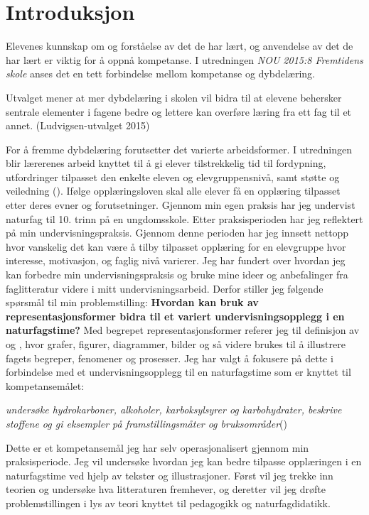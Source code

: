 \documentclass[main.tex]{subfiles}
\begin{document}
\section*{Introduksjon}

Elevenes kunnskap om og forståelse av det de har lært, og anvendelse av det de har lært er viktig for å oppnå kompetanse. I utredningen \emph{NOU 2015:8 Fremtidens skole} anses det en tett forbindelse mellom kompetanse og dybdelæring.
\begin{displayquote}
Utvalget mener at mer dybdelæring i skolen vil bidra til at elevene behersker sentrale elementer i fagene bedre og lettere kan overføre læring fra ett fag til et annet. (Ludvigsen-utvalget 2015)
\end{displayquote}
For å fremme dybdelæring forutsetter det varierte arbeidsformer. I utredningen blir lærerenes arbeid knyttet til å gi elever tilstrekkelig tid til fordypning, utfordringer tilpasset den enkelte eleven og elevgruppensnivå, samt støtte og veiledning ().
\newline\newline
Ifølge opplæringsloven skal alle elever få en opplæring tilpasset etter deres evner og forutsetninger. Gjennom min egen praksis har jeg undervist naturfag til 10. trinn på en ungdomsskole. Etter praksisperioden har jeg reflektert på min undervisningspraksis. Gjennom denne perioden har jeg innsett nettopp hvor vanskelig det kan være å tilby tilpasset opplæring for en elevgruppe hvor interesse, motivasjon, og faglig nivå varierer. Jeg har fundert over hvordan jeg kan forbedre min undervisningspraksis og bruke mine ideer og anbefalinger fra faglitteratur videre i mitt undervisningsarbeid. Derfor stiller jeg følgende spørsmål til min \mbox{problemstilling:}
\newline
\newline
\textbf{Hvordan kan bruk av representasjonsformer bidra til et variert undervisningsopplegg i en naturfagstime?}
\newline
\newline
Med begrepet representasjonsformer referer jeg til definisjon av  og , hvor grafer, figurer, diagrammer, bilder og så videre brukes til å illustrere fagets begreper, fenomener og prosesser. Jeg har valgt å fokusere på dette i forbindelse med et undervisningsopplegg til en naturfagstime som er knyttet til kompetansemålet:
\begin{displayquote}
\emph{undersøke hydrokarboner, alkoholer, karboksylsyrer og karbohydrater, beskrive stoffene og gi eksempler på framstillingsmåter og bruksområder}\newline ()
\end{displayquote}
Dette er et kompetansemål jeg har selv operasjonalisert gjennom min praksisperiode. Jeg vil undersøke hvordan jeg kan bedre tilpasse opplæringen i en naturfagstime ved hjelp av tekster og illustrasjoner. Først vil jeg trekke inn teorien og undersøke hva litteraturen fremhever, og deretter vil jeg drøfte problemstillingen i lys av teori knyttet til pedagogikk og naturfagdidatikk. 
\end{document}
